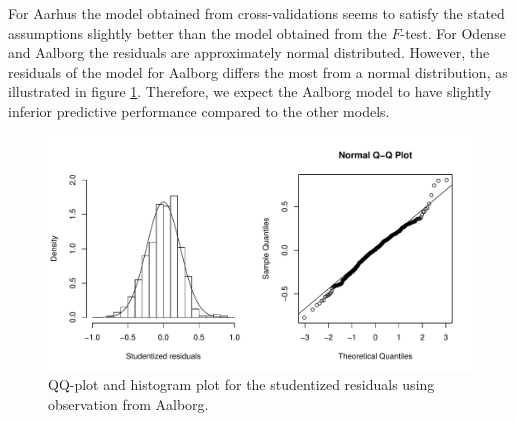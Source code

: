 For Aarhus the model obtained from cross-validations seems to satisfy the stated assumptions slightly better than the model obtained from the $F$-test. 
For Odense and Aalborg the residuals are approximately normal distributed. 
However, the residuals of the model for Aalborg differs the most from a normal distribution, as illustrated in figure \ref{fig:studentized_res_plot_Aalborg}.
Therefore, we expect the Aalborg model to have slightly inferior predictive performance compared to the other models.

\begin{figure}[H]
    \centering
  \includegraphics[width = 0.95 \textwidth]{figures/Nanna/NormalAal.pdf}
  \caption{QQ-plot and histogram plot for the studentized residuals using observation from Aalborg.}
  \label{fig:studentized_res_plot_Aalborg}
\end{figure}

    


